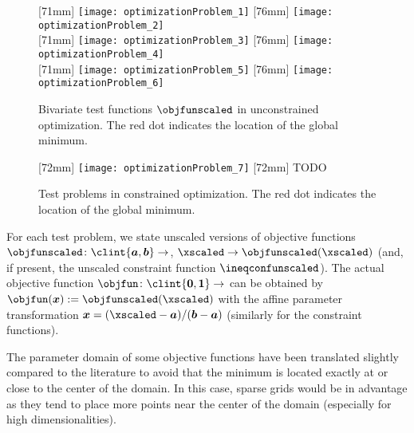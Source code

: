 \begin{figure}
  [71mm]{%
    \texttt{[image: optimizationProblem\_1]}%
  }%
  \hfill%
  [76mm]{%
    \texttt{[image: optimizationProblem\_2]}%
  }\\[2.5mm]%
  [71mm]{%
    \texttt{[image: optimizationProblem\_3]}%
  }%
  \hfill%
  [76mm]{%
    \texttt{[image: optimizationProblem\_4]}%
  }\\[2.5mm]%
  [71mm]{%
    \texttt{[image: optimizationProblem\_5]}%
  }%
  \hfill%
  [76mm]{%
    \texttt{[image: optimizationProblem\_6]}%
  }%
  \caption[%
    Unconstrained test problems%
  ]{%
    Bivariate test functions $\objfunscaled$ in unconstrained optimization.
    The \textcolor{C1}{red dot} indicates the location of the
    global minimum.%
  }%
  \label{fig:unconstrainedOptimizationProblem}%
\end{figure}

\begin{figure}
  [72mm]{%
    \texttt{[image: optimizationProblem\_7]}%
  }%
  \hfill%
  [72mm]{%
    TODO%
  }%
  \caption[%
    Constrained test problems%
  ]{%
    Test problems in constrained optimization.
    The \textcolor{C1}{red dot} indicates the location of the
    global minimum.%
  }%
  \label{fig:constrainedOptimizationProblem}%
\end{figure}

For each test problem, we state unscaled versions of objective functions
$\objfunscaled\colon \clint{\*a, \*b} \to \real$,
$\xscaled \to \objfunscaled(\xscaled)$
(and, if present, the unscaled constraint function $\ineqconfunscaled$).
The actual objective function $\objfun\colon \clint{\*0, \*1} \to \real$
can be obtained by $\objfun(\*x) := \objfunscaled(\xscaled)$
with the affine parameter transformation
$\*x = (\xscaled - \*a)/(\*b - \*a)$
(similarly for the constraint functions).

The parameter domain of some objective functions have been translated slightly
compared to the literature
to avoid that the minimum is located exactly at or close to
the center of the domain.
In this case, sparse grids would be in advantage as
they tend to place more points near the center of the domain
(especially for high dimensionalities).
